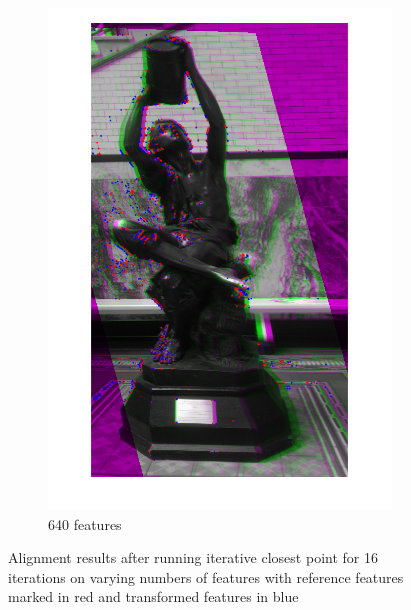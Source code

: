 \documentclass[sigconf]{acmart/acmart}
\begin{document}
\begin{figure}[h]
\begin{subfigure}[b]{0.3\textwidth}
    	\includegraphics[width=\textwidth]{figures/alignment/fused_640_features_16_iterations}
    	\caption{640 features}
    \end{subfigure}
	\caption{Alignment results after running iterative closest point for 16 iterations on varying numbers of features with reference features marked in red and transformed features in blue}
	\label{fig_alignment_results}
\end{figure}
\end{document}
